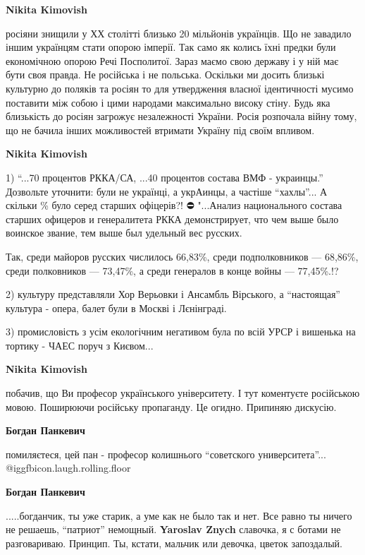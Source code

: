 \begin{itemize}
\begin{itemize}
\textbf{Nikita Kimovish} 

росіяни знищили у ХХ столітті близько 20 мільйонів українців. Що не завадило
іншим українцям стати опорою імперії. Так само як колись їхні предки були
економічною опорою Речі Посполитої. Зараз маємо свою державу і у ній має бути
своя правда. Не російська і не польська. Оскільки ми досить близькі культурно
до поляків та росіян то для утвердження власної ідентичності мусимо поставити
між собою і цими народами максимально високу стіну. Будь яка близькість до
росіян загрожує незалежності України. Росія розпочала війну тому, що не бачила
інших можливостей втримати Україну під своїм впливом.

\textbf{Nikita Kimovish} 

1) \enquote{...70 процентов РККА/СА, ...40 процентов состава ВМФ - украинцы.} Дозвольте
уточнити: були не українці, а укрАинцы, а частіше \enquote{хахлы}... А скільки \% було
серед старших офіцерів?! ⛔️ "...Анализ национального состава старших офицеров и
генералитета РККА демонстрирует, что чем выше было воинское звание, тем выше
был удельный вес русских.

Так, среди майоров русских числилось 66,83\%, среди подполковников — 68,86\%,
среди полковников — 73,47\%, а среди генералов в конце войны — 77,45\%.!?

2) культуру представляли Хор Верьовки і Ансамбль Вірського, а \enquote{настоящая}
культура - опера, балет були в Москві і Лєнінграді. 

3) промисловість з усім екологічним негативом була по всій УРСР і вишенька на
тортику - ЧАЕС поруч з Києвом...

\textbf{Nikita Kimovish} 

побачив, що Ви професор українського університету. І тут коментуєте російською
мовою. Поширюючи російську пропаганду. Це огидно. Припиняю дискусію.

\textbf{Богдан Панкевич} 

помиляєтеся, цей пан - професор колишнього \enquote{советского университета}...
@igg{fbicon.laugh.rolling.floor} 

\textbf{Богдан Панкевич} 

.....богданчик, ты уже старик, а уме как не было так и нет. Все равно ты ничего
не решаешь, \enquote{патриот} немощный. \textbf{Yaroslav Znych} славочка, я с ботами не
разговариваю. Принцип. Ты, кстати, мальчик или девочка, цветок запоздалый.


\end{itemize} %

\end{itemize} %
